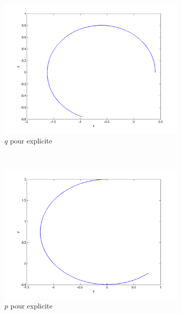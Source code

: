 \begin{figure}
  \centering
  \begin{subfigure}[b]{0.3\textwidth}
    \includegraphics[width=\textwidth]{images/Q1_explicite_q.png}
    \caption{$q$ pour explicite}
    \label{fig:q1_explicite_q}
  \end{subfigure}%
  ~ %
  \begin{subfigure}[b]{0.3\textwidth}
    \includegraphics[width=\textwidth]{images/Q1_explicite_p.png}
    \caption{$p$ pour explicite}
    \label{fig:q1_explicite_p}
  \end{subfigure}
  ~
  \begin{subfigure}[b]{0.3\textwidth}

\end{subfigure}
\end{figure}
